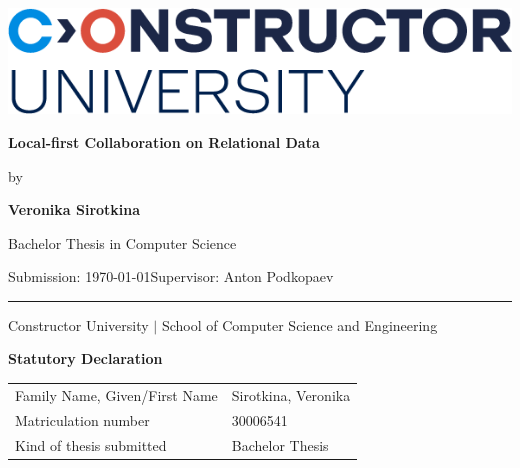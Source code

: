 \documentclass[a4paper, 11pt, oneside]{article}
\newcommand{\mylastname}{Sirotkina}
\newcommand{\myfirstname}{Veronika}
\newcommand{\mynumber}{30006541}
\newcommand{\myname}{\myfirstname{} \mylastname{}}
\newcommand{\mytitle}{Local-first Collaboration on Relational Data}
\newcommand{\mysupervisor}{Anton Podkopaev}
\theoremstyle{definition}
\begin{document}

\thispagestyle{empty}

\begin{flushright}
\includegraphics[scale=0.8]{img/bsc-logo.png}
\end{flushright}
\vspace*{40mm}
\begin{center}
\huge \textbf{\mytitle}
\end{center}
\vspace*{4mm}
\begin{center}
\Large by
\end{center}
\vspace*{4mm}
\begin{center}
\LARGE \textbf{\myname}
\end{center}
\vspace*{20mm}
\begin{center}
\Large Bachelor Thesis in Computer Science
\end{center}
\vfill
\begin{flushleft}
\large Submission: \today \hfill Supervisor: \mysupervisor \\ \rule{\textwidth}{1pt}
\end{flushleft}
\begin{center}
Constructor University $|$ School of Computer Science and Engineering
\end{center}

\newpage
\thispagestyle{empty}

\begin{center}
\Large \textbf{Statutory Declaration}
\vspace*{8mm}
\end{center}

\begin{center}
\begin{tabular}{|l|p{85mm}|}
\hline
Family Name, Given/First Name & \mylastname, \myfirstname \\
Matriculation number          & \mynumber                 \\
Kind of thesis submitted      & Bachelor Thesis           \\
\hline
\end{tabular}
\vspace*{8mm}
\end{center}
\end{document}
